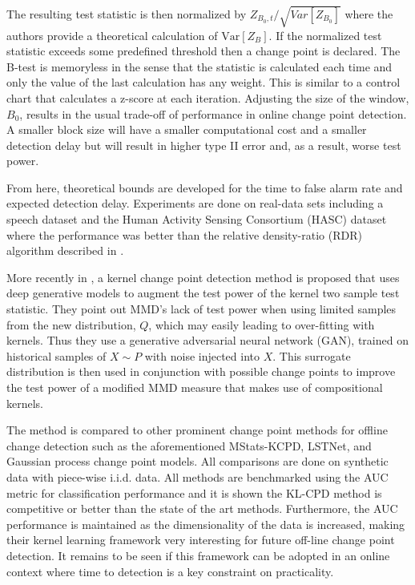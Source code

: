 The resulting test statistic is then normalized by $Z_{B_{0}, t}/\sqrt{Var[Z_{B_0}]}$ where the authors provide a theoretical calculation of $\text{Var}[Z_B]$. If the normalized test statistic exceeds some predefined threshold then a change point is declared. The B-test is memoryless in the sense that the statistic is calculated each time and only the value of the last calculation has any weight. This is similar to a control chart that calculates a z-score at each iteration. Adjusting the size of the window, $B_0$, results in the usual trade-off of performance in online change point detection. A smaller block size will have a smaller computational cost and a smaller detection delay but will result in higher type II error and, as a result, worse test power.

From here, theoretical bounds are developed for the time to false alarm rate and expected detection delay. Experiments are done on real-data sets including a speech dataset  and the Human Activity Sensing Consortium (HASC) dataset where the performance was better than the relative density-ratio (RDR) algorithm described in \cite{liu2013change}.

More recently in \cite{chang2019kernel}, a  kernel change point detection method is proposed that uses deep generative models to augment the test power of the kernel two sample test statistic. They point out MMD's lack of test power when using limited samples from the new distribution, $Q$, which may easily leading to over-fitting with kernels. Thus they use a generative adversarial neural network (GAN), trained on historical samples of $X \sim  P$  with noise injected into $X$. This surrogate distribution is then used in conjunction with possible change points to improve the test power of a modified MMD measure that makes use of compositional kernels.

The method is compared to other prominent change point methods for offline  change detection such as the aforementioned MStats-KCPD, LSTNet, and Gaussian process change point models. All comparisons are done on synthetic data with piece-wise i.i.d. data. All methods are benchmarked using the AUC metric for classification performance and it is shown the KL-CPD method is competitive or better than the state of the art methods.  Furthermore, the AUC performance is maintained as the dimensionality of the data is increased, making their kernel learning framework very interesting for future off-line change point detection. It remains to be seen if this framework can be adopted in an online context where time to detection is a key constraint on practicality.


